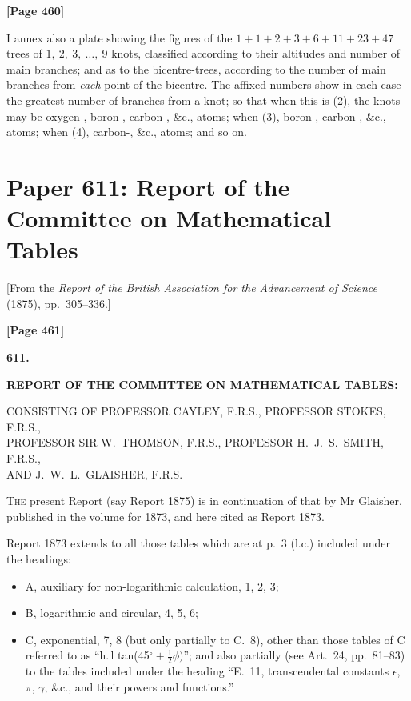 \documentclass[11pt,a4paper]{article}
\begin{document}
\newpage
\textbf{[Page 460]}

I annex also a plate showing the figures of the $1 + 1 + 2 + 3 + 6 + 11 + 23 + 47$ trees of $1,\ 2,\ 3,\ \ldots,\ 9$ knots, classified according to their altitudes and number of main branches; and as to the bicentre-trees, according to the number of main branches from \textit{each} point of the bicentre. The affixed numbers show in each case the greatest number of branches from a knot; so that when this is (2), the knots may be oxygen-, boron-, carbon-, \&c., atoms; when (3), boron-, carbon-, \&c., atoms; when (4), carbon-, \&c., atoms; and so on.

\newpage
\section{Paper 611: Report of the Committee on Mathematical Tables}

\begin{center}
{\small[From the \textit{Report of the British Association for the Advancement of Science} (1875), pp.\ 305--336.]}
\end{center}

\textbf{[Page 461]}

\begin{center}
\textbf{611.}

\textbf{REPORT OF THE COMMITTEE ON MATHEMATICAL TABLES:}

\small
CONSISTING OF PROFESSOR CAYLEY, F.R.S., PROFESSOR STOKES, F.R.S.,\\
PROFESSOR SIR W.\ THOMSON, F.R.S., PROFESSOR H.\ J.\ S.\ SMITH, F.R.S.,\\
AND J.\ W.\ L.\ GLAISHER, F.R.S.
\end{center}

\normalsize
\textsc{The} present Report (say Report 1875) is in continuation of that by Mr Glaisher, published in the volume for 1873, and here cited as Report 1873.

Report 1873 extends to all those tables which are at p.\ 3 (l.c.) included under the headings:
\begin{itemize}[nosep]
\item A, auxiliary for non-logarithmic calculation, 1, 2, 3;
\item B, logarithmic and circular, 4, 5, 6;
\item C, exponential, 7, 8 (but only partially to C.\ 8), other than those tables of C referred to as ``h.\,l tan(45$^{\circ} + \frac{1}{2}\phi)$''; and also partially (see Art.\ 24, pp.\ 81--83) to the tables included under the heading ``E.\ 11, transcendental constants $\epsilon$, $\pi$, $\gamma$, \&c., and their powers and functions.''
\end{itemize}
\end{document}
